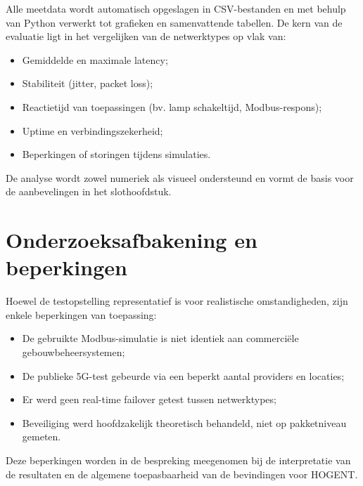 Alle meetdata wordt automatisch opgeslagen in CSV-bestanden en met behulp van Python verwerkt tot grafieken en samenvattende tabellen. De kern van de evaluatie ligt in het vergelijken van de netwerktypes op vlak van:

\begin{itemize}
    \item Gemiddelde en maximale latency;
    \item Stabiliteit (jitter, packet loss);
    \item Reactietijd van toepassingen (bv. lamp schakeltijd, Modbus-respons);
    \item Uptime en verbindingszekerheid;
    \item Beperkingen of storingen tijdens simulaties.
\end{itemize}

De analyse wordt zowel numeriek als visueel ondersteund en vormt de basis voor de aanbevelingen in het slothoofdstuk.

\section{Onderzoeksafbakening en beperkingen}

Hoewel de testopstelling representatief is voor realistische omstandigheden, zijn enkele beperkingen van toepassing:

\begin{itemize}
    \item De gebruikte Modbus-simulatie is niet identiek aan commerciële gebouwbeheersystemen;
    \item De publieke 5G-test gebeurde via een beperkt aantal providers en locaties;
    \item Er werd geen real-time failover getest tussen netwerktypes;
    \item Beveiliging werd hoofdzakelijk theoretisch behandeld, niet op pakketniveau gemeten.
\end{itemize}

Deze beperkingen worden in de bespreking meegenomen bij de interpretatie van de resultaten en de algemene toepasbaarheid van de bevindingen voor HOGENT.




